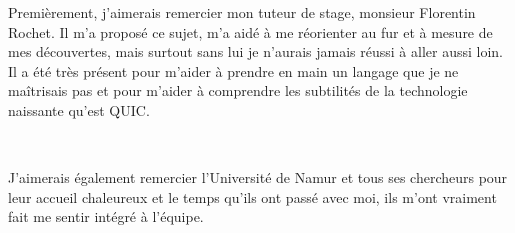 Premièrement, j'aimerais remercier mon tuteur de stage, monsieur Florentin Rochet. Il m'a proposé ce sujet, m'a aidé à me réorienter au fur et à mesure de mes découvertes, mais surtout sans lui je n'aurais jamais réussi à aller aussi loin.
Il a été très présent pour m'aider à prendre en main un langage que je ne maîtrisais pas et pour m'aider à comprendre les subtilités de la technologie naissante qu'est QUIC.

\ 

J'aimerais également remercier l'Université de Namur et tous ses chercheurs pour leur accueil chaleureux et le temps qu'ils ont passé avec moi, ils m'ont vraiment fait me sentir intégré à l'équipe.